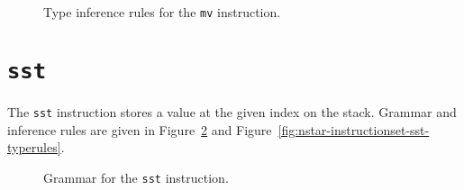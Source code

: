 \begin{figure}[H]
  \centering


  \caption{Type inference rules for the \texttt{mv} instruction.}
  \label{fig:nstar-instructionset-mv-typerules}
\end{figure}

\section{\texttt{sst}}\label{sec:nstar-instructionset-sst}

The \texttt{sst} instruction stores a value at the given index on the stack.
Grammar and inference rules are given in Figure~\ref{fig:nstar-instructionset-sst-grammar} and Figure~\ref{fig:nstar-instructionset-sst-typerules}.

\begin{figure}[H]
  \centering


  \caption{Grammar for the \texttt{sst} instruction.}
  \label{fig:nstar-instructionset-sst-grammar}
\end{figure}

